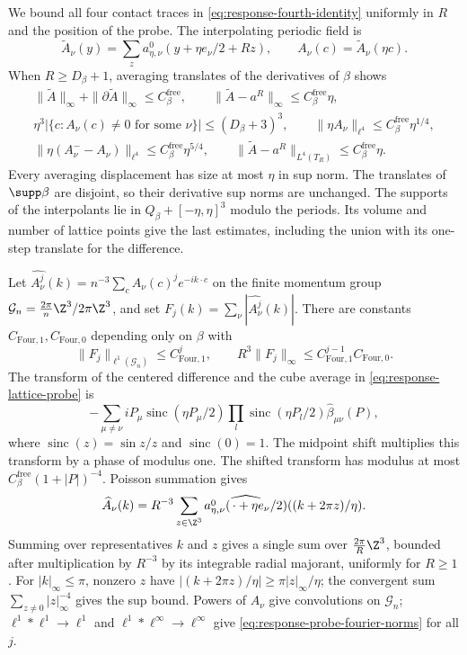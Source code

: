 \documentclass[11pt,letterpaper,reqno]{amsart}
\begin{document}
We bound all four contact traces in
\eqref{eq:response-fourth-identity} uniformly in $R$ and the
position of the probe. The interpolating periodic field is
\[
 \widetilde A_\nu(y)=\sum_z
             a_{\eta,\nu}^0(y+\eta e_\nu/2+Rz),
 \qquad A_\nu(c)=\widetilde A_\nu(\eta c).
\]
When $R\ge D_\beta+1$, averaging translates of the derivatives
of $\beta$ shows
\begin{equation}\label{eq:response-probe-estimates}
 \begin{gathered}
 \|\widetilde A\|_\infty+\|\partial\widetilde A\|_\infty\le C_\beta^{\mathrm{free}},
 \qquad \|\widetilde A-a^R\|_\infty\le C_\beta^{\mathrm{free}}\eta,\\
 \eta^3|\{c:A_\nu(c)\ne0\text{ for some }\nu\}|\le(D_\beta+3)^3,
 \qquad
 \|\eta A_\nu\|_{\ell^4}\le C_\beta^{\mathrm{free}}\eta^{1/4},\\
 \|\eta(A_\nu^--A_\nu)\|_{\ell^4}\le C_\beta^{\mathrm{free}}\eta^{5/4},
 \qquad\|\widetilde A-a^R\|_{L^4(T_R)}\le C_\beta^{\mathrm{free}}\eta.
 \end{gathered}
\end{equation}
Every averaging displacement has size at most $\eta$ in
sup norm. The translates of $\supp\beta$ are disjoint,
so their derivative sup norms are unchanged. The supports
of the interpolants lie in $Q_\beta+[-\eta,\eta]^3$ modulo
the periods. Its volume and number of lattice points give
the last estimates, including the union with its one-step
translate for the difference.

Let $\widehat{A_\nu^j}(k)=n^{-3}\sum_cA_\nu(c)^je^{-ik\cdot c}$
on the finite momentum group $\mathcal G_n=\frac{2\pi}{n}\Z^3/
2\pi\Z^3$, and set $F_j(k)=\sum_\nu|\widehat{A_\nu^j}(k)|$.
There are constants $C_{\mathrm{Four},1},C_{\mathrm{Four},0}$ depending only on $\beta$ with
\begin{equation}\label{eq:response-probe-fourier-norms}
 \|F_j\|_{\ell^1(\mathcal G_n)}\le C_{\mathrm{Four},1}^j,
 \qquad R^3\|F_j\|_\infty\le C_{\mathrm{Four},1}^{j-1}C_{\mathrm{Four},0}.
\end{equation}
The transform of the centered difference and the cube average
in \eqref{eq:response-lattice-probe} is
\[
 -\sum_{\mu\ne\nu}iP_\mu\operatorname{sinc}(\eta P_\mu/2)
 \prod_l\operatorname{sinc}(\eta P_l/2)\widehat\beta_{\mu\nu}(P),
\]
where $\operatorname{sinc}(z)=\sin z/z$ and $\operatorname{sinc}(0)=1$.
The midpoint shift multiplies this transform by a phase of modulus one.
The shifted transform has modulus at most
$C_\beta^{\mathrm{free}}(1+|P|)^{-4}$. Poisson summation \cite[Theorems~4--7]{GuthFourier2015} gives
\[
 \widehat A_\nu(k)=R^{-3}\sum_{z\in\Z^3}
      \widehat{a_{\eta,\nu}^0(\,\cdot+\eta e_\nu/2)}
                                      ((k+2\pi z)/\eta).
\]
Summing over representatives $k$ and $z$ gives a single
sum over $\frac{2\pi}{R}\Z^3$, bounded after multiplication
by $R^{-3}$ by its integrable radial majorant, uniformly
for $R\ge1$. For $|k|_\infty\le\pi$, nonzero $z$ have
$|(k+2\pi z)/\eta|\ge\pi|z|_\infty/\eta$; the convergent
sum $\sum_{z\ne0}|z|_\infty^{-4}$ gives the sup bound.
Powers of $A_\nu$ give convolutions on $\mathcal G_n$;
$\ell^1*\ell^1\to\ell^1$ and $\ell^1*\ell^\infty\to\ell^\infty$
give \eqref{eq:response-probe-fourier-norms} for all $j$.
\end{document}
